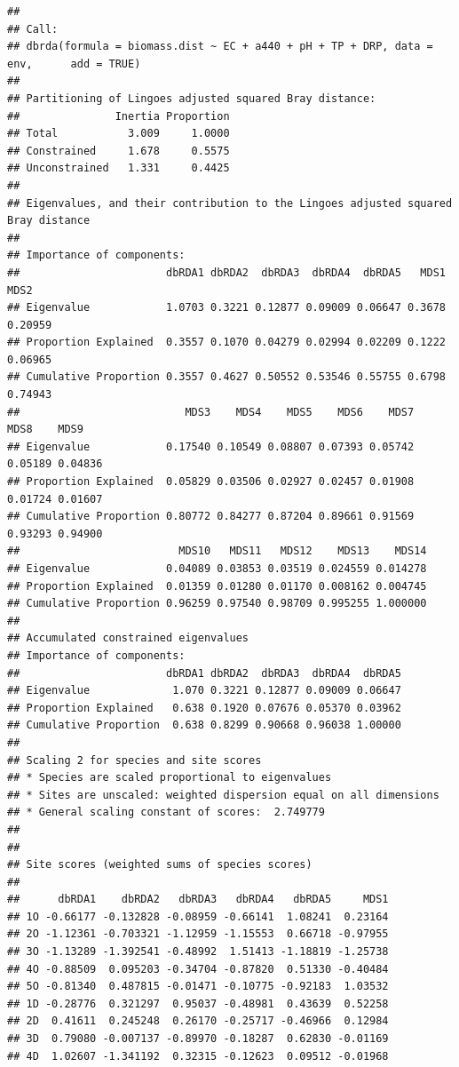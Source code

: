 \documentclass[
]{book}
\begin{document}
\begin{verbatim}
## 
## Call:
## dbrda(formula = biomass.dist ~ EC + a440 + pH + TP + DRP, data = env,      add = TRUE) 
## 
## Partitioning of Lingoes adjusted squared Bray distance:
##               Inertia Proportion
## Total           3.009     1.0000
## Constrained     1.678     0.5575
## Unconstrained   1.331     0.4425
## 
## Eigenvalues, and their contribution to the Lingoes adjusted squared Bray distance 
## 
## Importance of components:
##                       dbRDA1 dbRDA2  dbRDA3  dbRDA4  dbRDA5   MDS1    MDS2
## Eigenvalue            1.0703 0.3221 0.12877 0.09009 0.06647 0.3678 0.20959
## Proportion Explained  0.3557 0.1070 0.04279 0.02994 0.02209 0.1222 0.06965
## Cumulative Proportion 0.3557 0.4627 0.50552 0.53546 0.55755 0.6798 0.74943
##                          MDS3    MDS4    MDS5    MDS6    MDS7    MDS8    MDS9
## Eigenvalue            0.17540 0.10549 0.08807 0.07393 0.05742 0.05189 0.04836
## Proportion Explained  0.05829 0.03506 0.02927 0.02457 0.01908 0.01724 0.01607
## Cumulative Proportion 0.80772 0.84277 0.87204 0.89661 0.91569 0.93293 0.94900
##                         MDS10   MDS11   MDS12    MDS13    MDS14
## Eigenvalue            0.04089 0.03853 0.03519 0.024559 0.014278
## Proportion Explained  0.01359 0.01280 0.01170 0.008162 0.004745
## Cumulative Proportion 0.96259 0.97540 0.98709 0.995255 1.000000
## 
## Accumulated constrained eigenvalues
## Importance of components:
##                       dbRDA1 dbRDA2  dbRDA3  dbRDA4  dbRDA5
## Eigenvalue             1.070 0.3221 0.12877 0.09009 0.06647
## Proportion Explained   0.638 0.1920 0.07676 0.05370 0.03962
## Cumulative Proportion  0.638 0.8299 0.90668 0.96038 1.00000
## 
## Scaling 2 for species and site scores
## * Species are scaled proportional to eigenvalues
## * Sites are unscaled: weighted dispersion equal on all dimensions
## * General scaling constant of scores:  2.749779 
## 
## 
## Site scores (weighted sums of species scores)
## 
##      dbRDA1    dbRDA2   dbRDA3   dbRDA4   dbRDA5     MDS1
## 1O -0.66177 -0.132828 -0.08959 -0.66141  1.08241  0.23164
## 2O -1.12361 -0.703321 -1.12959 -1.15553  0.66718 -0.97955
## 3O -1.13289 -1.392541 -0.48992  1.51413 -1.18819 -1.25738
## 4O -0.88509  0.095203 -0.34704 -0.87820  0.51330 -0.40484
## 5O -0.81340  0.487815 -0.01471 -0.10775 -0.92183  1.03532
## 1D -0.28776  0.321297  0.95037 -0.48981  0.43639  0.52258
## 2D  0.41611  0.245248  0.26170 -0.25717 -0.46966  0.12984
## 3D  0.79080 -0.007137 -0.89970 -0.18287  0.62830 -0.01169
## 4D  1.02607 -1.341192  0.32315 -0.12623  0.09512 -0.01968

\end{verbatim}
\end{document}
